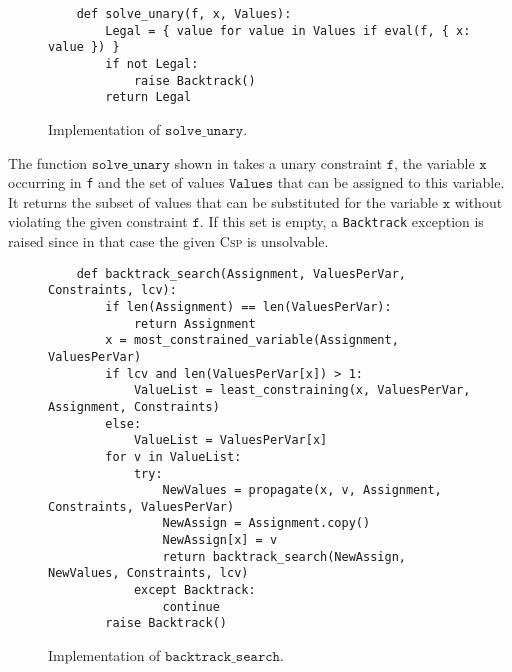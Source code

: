 \begin{figure}[!ht]
\centering
\begin{verbatim}
    def solve_unary(f, x, Values):
        Legal = { value for value in Values if eval(f, { x: value }) }
        if not Legal:
            raise Backtrack()
        return Legal
\end{verbatim}
\vspace*{-0.3cm}
\caption{Implementation of $\texttt{solve\_unary}$.}
\label{fig:Constraint-Propagation-Solver.ipynb:solve_unary}
\end{figure}

The function $\texttt{solve\_unary}$ shown in  takes a unary
constraint $\texttt{f}$, the variable $\texttt{x}$ occurring in \texttt{f} and the set of values $\texttt{Values}$ that can be assigned to this
variable.  It returns the subset of values that can be substituted for the variable $\texttt{x}$
without violating the given constraint $\texttt{f}$.  If this set is empty, a \texttt{Backtrack} exception is
raised since in that case the given \textsc{Csp} is unsolvable.


\begin{figure}[!ht]
\centering
\begin{verbatim}
    def backtrack_search(Assignment, ValuesPerVar, Constraints, lcv):
        if len(Assignment) == len(ValuesPerVar):
            return Assignment
        x = most_constrained_variable(Assignment, ValuesPerVar)
        if lcv and len(ValuesPerVar[x]) > 1:
            ValueList = least_constraining(x, ValuesPerVar, Assignment, Constraints)
        else:
            ValueList = ValuesPerVar[x]
        for v in ValueList: 
            try:
                NewValues = propagate(x, v, Assignment, Constraints, ValuesPerVar)
                NewAssign = Assignment.copy()
                NewAssign[x] = v
                return backtrack_search(NewAssign, NewValues, Constraints, lcv)
            except Backtrack:
                continue
        raise Backtrack()
\end{verbatim}
\vspace*{-0.3cm}
\caption{Implementation of $\texttt{backtrack\_search}$.}
\label{fig:Constraint-Propagation-Solver.ipynb:backtrack_search}
\end{figure}

